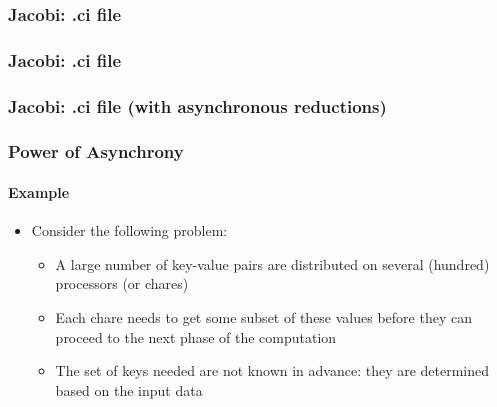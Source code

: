 \documentclass{beamer}
\begin{document}
\begin{frame}[fragile]
  \frametitle{Jacobi: .ci file}
  
\end{frame}

\begin{frame}[fragile]
  \frametitle{Jacobi: .ci file}
  
\end{frame}

\begin{frame}[fragile]
  \frametitle{Jacobi: .ci file (with \textbf{asynchronous} reductions)}
  
\end{frame}


\begin{frame}[fragile]
  \frametitle{Power of Asynchrony}
  \framesubtitle{Example}

  \begin{itemize}
    \item Consider the following problem:
    \begin{itemize}
      \item A large number of key-value pairs are distributed on several (hundred) processors  (or chares)
      \pause
      \item Each chare needs to get some subset of these values before they can proceed to the next phase of the computation
      \pause 
      \item The set of keys needed are not known in advance: they are determined based on the input data
    \end{itemize}
  \end{itemize}
\end{frame}
\end{document}
